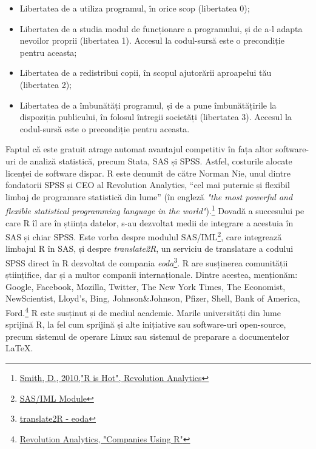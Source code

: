 \documentclass[
  11pt,
  b5paper,
  nottoc]{book}
\begin{document}
\begin{itemize}
\item Libertatea de a utiliza programul, în orice scop (libertatea 0);
\item Libertatea de a studia modul de funcționare a programului, și de a-l adapta nevoilor proprii (libertatea 1). Accesul la codul-sursă este o precondiție pentru aceasta;
\item Libertatea de a redistribui copii, în scopul ajutorării aproapelui tău (libertatea 2);
\item Libertatea de a îmbunătăți programul, și de a pune îmbunătățirile la dispoziția publicului, în folosul întregii societăți (libertatea 3). Accesul la codul-sursă este o precondiție pentru aceasta.
\end{itemize}

Faptul că este gratuit atrage automat avantajul competitiv în fața altor
software-uri de analiză statistică, precum Stata, SAS și SPSS. Astfel,
costurile alocate licenței de software dispar. \textsf{R} este denumit
de către Norman Nie, unul dintre fondatorii SPSS și CEO al Revolution
Analytics, ``cel mai puternic și flexibil limbaj de programare
statistică din lume'' (în engleză
\textit{"the most powerful and flexible statistical programming language in the world"}).\footnote{\href{http://blog.revolutionanalytics.com/2010/10/r-is-hot.html}{Smith, D., 2010,"R is Hot", Revolution Analytics}}
Dovadă a succesului pe care \textsf{R} îl are în știința datelor, s-au
dezvoltat medii de integrare a acestuia în SAS și chiar SPSS. Este vorba
despre modulul
SAS/IML\footnote{\href{http://www.sas.com/en_us/software/analytics/iml.html\#close}{SAS/IML Module}},
care integrează limbajul \textsf{R} în SAS, și despre
\textit{translate2R}, un serviciu de translatare a codului SPSS direct
în \textsf{R} dezvoltat de compania
\textit{eoda}\footnote{\href{http://www.eoda.de/en/translate2R.html}{translate2R - eoda}}.
\textsf{R} are susținerea comunității științifice, dar și a multor
companii internaționale. Dintre acestea, menționăm: Google, Facebook,
Mozilla, Twitter, The New York Times, The Economist, NewScientist,
Lloyd's, Bing, Johnson\&Johnson, Pfizer, Shell, Bank of America,
Ford.\footnote{\href{http://www.revolutionanalytics.com/what-is-open-source-r/companies-using-r.php}{Revolution Analytics, "Companies Using R"}}
\textsf{R} este susținut și de mediul academic.
Marile universități din lume sprijină \textsf{R}, la fel cum sprijină și
alte inițiative sau software-uri open-source, precum sistemul de operare
Linux sau sistemul de preparare a documentelor \LaTeX.
\end{document}
